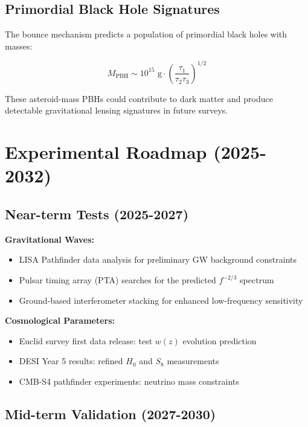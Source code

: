 \documentclass[reprint,amsmath,amssymb,aps,prd,nofootinbib,longbibliography]{revtex4-2}
\begin{document}
\subsection{Primordial Black Hole Signatures}

The bounce mechanism predicts a population of primordial black holes with masses:

\begin{equation}
M_{\text{PBH}} \sim 10^{15} \text{ g} \cdot \left(\frac{\tau_1}{\tau_2 \tau_3}\right)^{1/2}
\end{equation}

These asteroid-mass PBHs could contribute to dark matter and produce detectable gravitational lensing signatures in future surveys.

\section{Experimental Roadmap (2025-2032)}

\subsection{Near-term Tests (2025-2027)}

\textbf{Gravitational Waves:}
\begin{itemize}
\item LISA Pathfinder data analysis for preliminary GW background constraints
\item Pulsar timing array (PTA) searches for the predicted $f^{-2/3}$ spectrum
\item Ground-based interferometer stacking for enhanced low-frequency sensitivity
\end{itemize}

\textbf{Cosmological Parameters:}
\begin{itemize}
\item Euclid survey first data release: test $w(z)$ evolution prediction
\item DESI Year 5 results: refined $H_0$ and $S_8$ measurements
\item CMB-S4 pathfinder experiments: neutrino mass constraints
\end{itemize}

\subsection{Mid-term Validation (2027-2030)}
\end{document}
